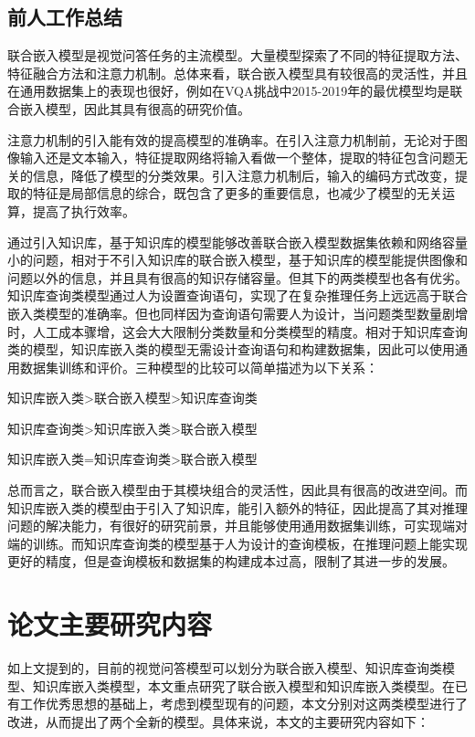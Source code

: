 \subsection{前人工作总结}

联合嵌入模型是视觉问答任务的主流模型。大量模型探索了不同的特征提取方法、特征融合方法和注意力机制。总体来看，联合嵌入模型具有较很高的灵活性，并且在通用数据集上的表现也很好，例如在VQA挑战中2015-2019年的最优模型均是联合嵌入模型，因此其具有很高的研究价值。

注意力机制的引入能有效的提高模型的准确率。在引入注意力机制前，无论对于图像输入还是文本输入，特征提取网络将输入看做一个整体，提取的特征包含问题无关的信息，降低了模型的分类效果。引入注意力机制后，输入的编码方式改变，提取的特征是局部信息的综合，既包含了更多的重要信息，也减少了模型的无关运算，提高了执行效率。

通过引入知识库，基于知识库的模型能够改善联合嵌入模型数据集依赖和网络容量小的问题，相对于不引入知识库的联合嵌入模型，基于知识库的模型能提供图像和问题以外的信息，并且具有很高的知识存储容量。但其下的两类模型也各有优劣。知识库查询类模型通过人为设置查询语句，实现了在复杂推理任务上远远高于联合嵌入类模型的准确率。但也同样因为查询语句需要人为设计，当问题类型数量剧增时，人工成本骤增，这会大大限制分类数量和分类模型的精度。相对于知识库查询类的模型，知识库嵌入类的模型无需设计查询语句和构建数据集，因此可以使用通用数据集训练和评价。三种模型的比较可以简单描述为以下关系：
\begin{description}[labelindent=2em, leftmargin=6em, style=sameline]
\item [解决识别类问题：]知识库嵌入类>联合嵌入模型>知识库查询类
\item [解决推理类问题：]知识库查询类>知识库嵌入类>联合嵌入模型
\item [模型迁移能力：]知识库嵌入类=知识库查询类>联合嵌入模型
\end{description}

总而言之，联合嵌入模型由于其模块组合的灵活性，因此具有很高的改进空间。而知识库嵌入类的模型由于引入了知识库，能引入额外的特征，因此提高了其对推理问题的解决能力，有很好的研究前景，并且能够使用通用数据集训练，可实现端对端的训练。而知识库查询类的模型基于人为设计的查询模板，在推理问题上能实现更好的精度，但是查询模板和数据集的构建成本过高，限制了其进一步的发展。

\section{论文主要研究内容}

如上文提到的，目前的视觉问答模型可以划分为联合嵌入模型、知识库查询类模型、知识库嵌入类模型，本文重点研究了联合嵌入模型和知识库嵌入类模型。在已有工作优秀思想的基础上，考虑到模型现有的问题，本文分别对这两类模型进行了改进，从而提出了两个全新的模型。具体来说，本文的主要研究内容如下：

